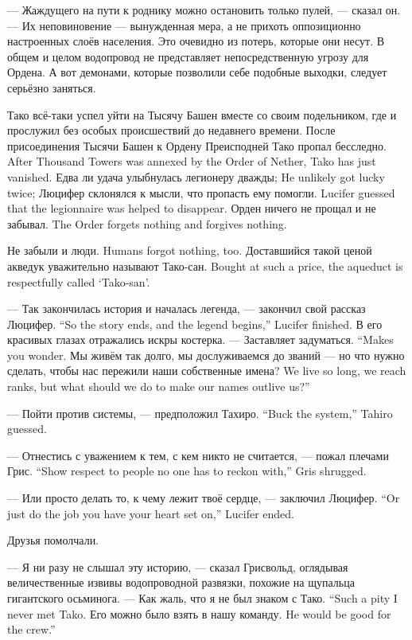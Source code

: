 --- Жаждущего на пути к роднику можно остановить только пулей, --- сказал он.
--- Их неповиновение --- вынужденная мера, а не прихоть оппозиционно настроенных слоёв населения.
Это очевидно из потерь, которые они несут.
В общем и целом водопровод не представляет непосредственную угрозу для Ордена.
А вот демонами, которые позволили себе подобные выходки, следует серьёзно заняться.

Тако всё-таки успел уйти на Тысячу Башен вместе со своим подельником, где и прослужил без особых происшествий до недавнего времени.
{После присоединения Тысячи Башен к Ордену Преисподней Тако пропал бесследно.}
{After Thousand Towers was annexed by the Order of Nether, Tako has just vanished.}
{Едва ли удача улыбнулась легионеру дважды;}
{He unlikely got lucky twice;}
{Люцифер склонялся к мысли, что пропасть ему помогли.}
{Lucifer guessed that the legionnaire was helped to disappear.}
{Орден ничего не прощал и не забывал.}
{The Order forgets nothing and forgives nothing.}

{Не забыли и люди.}
{Humans forgot nothing, too.}
{Доставшийся такой ценой акведук уважительно называют Тако-сан.}
{Bought at such a price, the aqueduct is respectfully called `Tako-san'.}

{--- Так закончилась история и началась легенда, --- закончил свой рассказ Люцифер.}
{``So the story ends, and the legend begins,'' Lucifer finished.}
В его красивых глазах отражались искры костерка.
{--- Заставляет задуматься.}
{``Makes you wonder.}
{Мы живём так долго, мы дослуживаемся до званий --- но что нужно сделать, чтобы нас пережили наши собственные имена?}
{We live so long, we reach ranks, but what should we do to make our names outlive us?''}

{--- Пойти против системы, --- предположил Тахиро.}
{``Buck the system,'' Tahiro guessed.}

{--- Отнестись с уважением к тем, с кем никто не считается, --- пожал плечами Грис.}
{``Show respect to people no one has to reckon with,'' Gris shrugged.}

{--- Или просто делать то, к чему лежит твоё сердце, --- заключил Люцифер.}
{``Or just do the job you have your heart set on,'' Lucifer ended.}

Друзья помолчали.

--- Я ни разу не слышал эту историю, --- сказал Грисвольд, оглядывая величественные извивы водопроводной развязки, похожие на щупальца гигантского осьминога.
{--- Как жаль, что я не был знаком с Тако.}
{``Such a pity I never met Tako.}
{Его можно было взять в нашу команду.}
{He would be good for the crew.''}


